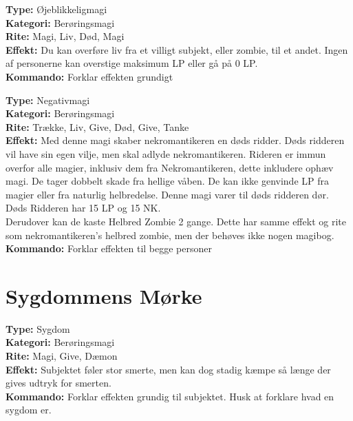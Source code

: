 \begin{zombie*}
\textbf{Type:} Øjeblikkeligmagi\\
\textbf{Kategori:} Berøringsmagi\\
\textbf{Rite:} Magi, Liv, Død, Magi\\
\textbf{Effekt:} Du kan overføre liv fra et villigt subjekt, eller zombie, til et andet. Ingen af personerne kan overstige maksimum LP eller gå på 0 LP.\\
\textbf{Kommando:} Forklar effekten grundigt
\end{zombie*}

\begin{zombie*}
\textbf{Type:} Negativmagi\\
\textbf{Kategori:} Berøringsmagi\\
\textbf{Rite:} Trække, Liv, Give, Død, Give, Tanke\\
\textbf{Effekt:} Med denne magi skaber nekromantikeren en døds ridder. Døds ridderen vil have sin egen vilje, men skal adlyde nekromantikeren. Rideren er immun overfor alle magier, inklusiv dem fra Nekromantikeren, dette inkludere ophæv magi. De tager dobbelt skade fra hellige våben. De kan ikke genvinde LP fra magier eller fra naturlig helbredelse. Denne magi varer til døds ridderen dør. Døds Ridderen har 15 LP og 15 NK.\\
Derudover kan de kaste Helbred Zombie 2 gange. Dette har samme effekt og rite som nekromantikeren's helbred zombie, men der behøves ikke nogen magibog.
\textbf{Kommando:} Forklar effekten til begge personer\\

\end{zombie*}

\section*{Sygdommens Mørke}

\begin{sygdom*}[Forrådnelse]
\textbf{Type:} Sygdom\\
\textbf{Kategori:} Berøringsmagi\\
\textbf{Rite:} Magi, Give, Dæmon\\
\textbf{Effekt:} Subjektet føler stor smerte, men kan dog stadig kæmpe så længe der gives udtryk for smerten.\\
\textbf{Kommando:} Forklar effekten grundig til subjektet. Husk at forklare hvad en sygdom er.
\end{sygdom*}

